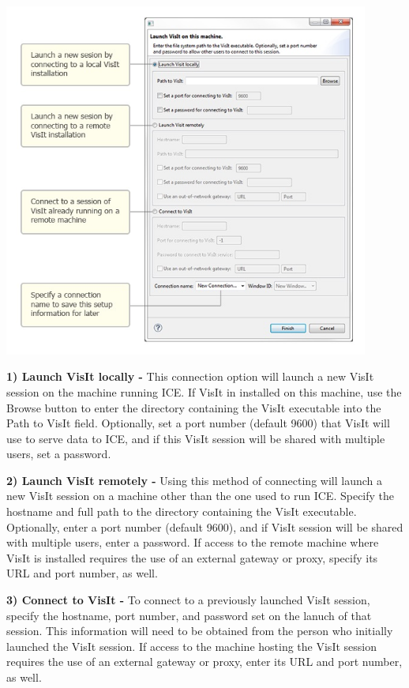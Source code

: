 \begin{center}
\includegraphics[width=12cm]{images/ICE_VisItLaunchOptions}
\end{center}

\textbf{1) Launch VisIt locally -} This connection option will launch a new
VisIt session on the machine running ICE. If VisIt in installed on this machine,
use the Browse button to enter the directory containing the VisIt executable
into the Path to VisIt field. Optionally, set a port number (default 9600) that
VisIt will use to serve data to ICE, and if this VisIt session will be shared
with multiple users, set a password.

\textbf{2) Launch VisIt remotely -} Using this method of connecting will launch
a new VisIt session on a machine other than the one used to run ICE. Specify the
hostname and full path to the directory containing the VisIt executable.
Optionally, enter a port number (default 9600), and if VisIt session will be
shared with multiple users, enter a password. If access to the remote machine
where VisIt is installed requires the use of an external gateway or proxy,
specify its URL and port number, as well.

\textbf{3) Connect to VisIt -} To connect to a previously launched VisIt
session, specify the hostname, port number, and password set on the lanuch of
that session. This information will need to be obtained from the person who
initially launched the VisIt session. If access to the machine hosting the VisIt
session requires the use of an external gateway or proxy, enter its URL and port
number, as well.

